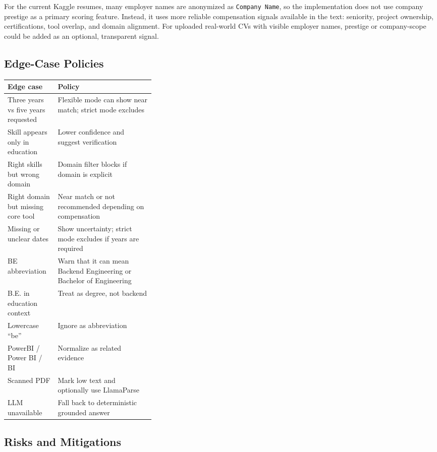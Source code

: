 \documentclass[11pt]{article}
\begin{document}
For the current Kaggle resumes, many employer names are anonymized as \texttt{Company Name}, so the implementation does not use company prestige as a primary scoring feature. Instead, it uses more reliable compensation signals available in the text: seniority, project ownership, certifications, tool overlap, and domain alignment. For uploaded real-world CVs with visible employer names, prestige or company-scope could be added as an optional, transparent signal.

\subsection{Edge-Case Policies}

\begin{center}
\begin{tabularx}{\linewidth}{|p{0.34\linewidth}|Y|}
\hline
\textbf{Edge case} & \textbf{Policy} \\
\hline
Three years vs five years requested & Flexible mode can show near match; strict mode excludes \\
\hline
Skill appears only in education & Lower confidence and suggest verification \\
\hline
Right skills but wrong domain & Domain filter blocks if domain is explicit \\
\hline
Right domain but missing core tool & Near match or not recommended depending on compensation \\
\hline
Missing or unclear dates & Show uncertainty; strict mode excludes if years are required \\
\hline
BE abbreviation & Warn that it can mean Backend Engineering or Bachelor of Engineering \\
\hline
B.E. in education context & Treat as degree, not backend \\
\hline
Lowercase ``be'' & Ignore as abbreviation \\
\hline
PowerBI / Power BI / BI & Normalize as related evidence \\
\hline
Scanned PDF & Mark low text and optionally use LlamaParse \\
\hline
LLM unavailable & Fall back to deterministic grounded answer \\
\hline
\end{tabularx}
\end{center}

\subsection{Risks and Mitigations}
\end{document}
